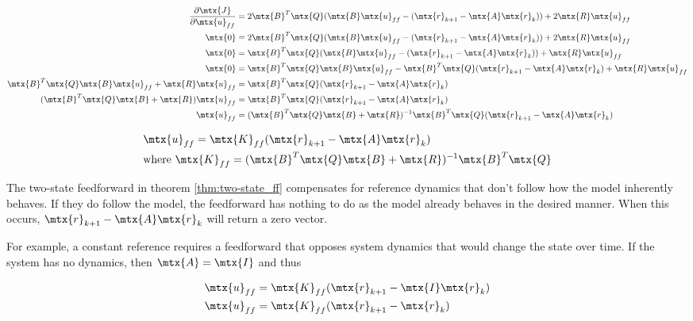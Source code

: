 \begin{align*}
  \frac{\partial\mtx{J}}{\partial\mtx{u}_{ff}} &= 2\mtx{B}^T\mtx{Q}
    (\mtx{B}\mtx{u}_{ff} - (\mtx{r}_{k+1} - \mtx{A}\mtx{r}_k)) +
    2\mtx{R}\mtx{u}_{ff} \\
  \mtx{0} &= 2\mtx{B}^T\mtx{Q}
    (\mtx{B}\mtx{u}_{ff} - (\mtx{r}_{k+1} - \mtx{A}\mtx{r}_k)) +
    2\mtx{R}\mtx{u}_{ff} \\
  \mtx{0} &= \mtx{B}^T\mtx{Q}
    (\mtx{B}\mtx{u}_{ff} - (\mtx{r}_{k+1} - \mtx{A}\mtx{r}_k)) +
    \mtx{R}\mtx{u}_{ff} \\
  \mtx{0} &= \mtx{B}^T\mtx{Q}\mtx{B}\mtx{u}_{ff} -
    \mtx{B}^T\mtx{Q}(\mtx{r}_{k+1} - \mtx{A}\mtx{r}_k) + \mtx{R}\mtx{u}_{ff} \\
  \mtx{B}^T\mtx{Q}\mtx{B}\mtx{u}_{ff} + \mtx{R}\mtx{u}_{ff} &=
    \mtx{B}^T\mtx{Q}(\mtx{r}_{k+1} - \mtx{A}\mtx{r}_k) \\
  (\mtx{B}^T\mtx{Q}\mtx{B} + \mtx{R})\mtx{u}_{ff} &=
    \mtx{B}^T\mtx{Q}(\mtx{r}_{k+1} - \mtx{A}\mtx{r}_k) \\
  \mtx{u}_{ff} &= (\mtx{B}^T\mtx{Q}\mtx{B} + \mtx{R})^{-1}
    \mtx{B}^T\mtx{Q}(\mtx{r}_{k+1} - \mtx{A}\mtx{r}_k)
\end{align*}

\begin{theorem}
  \label{thm:two-state_ff}

  \begin{align}
    &\mtx{u}_{ff} = \mtx{K}_{ff} (\mtx{r}_{k+1} - \mtx{A}\mtx{r}_k) \\
    &\text{where } \mtx{K}_{ff} =
      (\mtx{B}^T\mtx{Q}\mtx{B} + \mtx{R})^{-1}\mtx{B}^T\mtx{Q}
  \end{align}
\end{theorem}

The two-state feedforward in theorem \ref{thm:two-state_ff} compensates for
\gls{reference} dynamics that don't follow how the \gls{model} inherently
behaves. If they do follow the \gls{model}, the feedforward has nothing to do as
the \gls{model} already behaves in the desired manner. When this occurs,
$\mtx{r}_{k+1} - \mtx{A}\mtx{r}_k$ will return a zero vector.

For example, a constant \gls{reference} requires a feedforward that opposes
\gls{system} dynamics that would change the \gls{state} over time. If the
\gls{system} has no dynamics, then $\mtx{A} = \mtx{I}$ and thus

\begin{align*}
  \mtx{u}_{ff} &= \mtx{K}_{ff} (\mtx{r}_{k+1} - \mtx{I}\mtx{r}_k) \\
  \mtx{u}_{ff} &= \mtx{K}_{ff} (\mtx{r}_{k+1} - \mtx{r}_k)
\end{align*}

